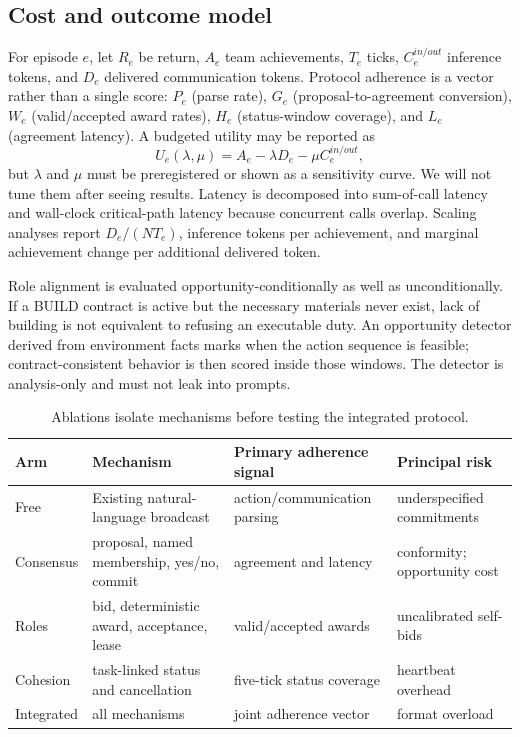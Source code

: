 \documentclass[11pt]{article}
\begin{document}
\subsection{Cost and outcome model}
For episode $e$, let $R_e$ be return, $A_e$ team achievements, $T_e$ ticks, $C_e^{in/out}$ inference tokens, and $D_e$ delivered communication tokens. Protocol adherence is a vector rather than a single score: $P_e$ (parse rate), $G_e$ (proposal-to-agreement conversion), $W_e$ (valid/accepted award rates), $H_e$ (status-window coverage), and $L_e$ (agreement latency). A budgeted utility may be reported as
\[
 U_e(\lambda,\mu)=A_e-\lambda D_e-\mu C_e^{in/out},
\]
but $\lambda$ and $\mu$ must be preregistered or shown as a sensitivity curve. We will not tune them after seeing results. Latency is decomposed into sum-of-call latency and wall-clock critical-path latency because concurrent calls overlap. Scaling analyses report $D_e/(N T_e)$, inference tokens per achievement, and marginal achievement change per additional delivered token.

Role alignment is evaluated opportunity-conditionally as well as unconditionally. If a BUILD contract is active but the necessary materials never exist, lack of building is not equivalent to refusing an executable duty. An opportunity detector derived from environment facts marks when the action sequence is feasible; contract-consistent behavior is then scored inside those windows. The detector is analysis-only and must not leak into prompts.

\begin{table}[t]
\centering\small
\begin{tabularx}{\textwidth}{lXXX}
\toprule
Arm & Mechanism & Primary adherence signal & Principal risk\\
\midrule
Free & Existing natural-language broadcast & action/communication parsing & underspecified commitments\\
Consensus & proposal, named membership, yes/no, commit & agreement and latency & conformity; opportunity cost\\
Roles & bid, deterministic award, acceptance, lease & valid/accepted awards & uncalibrated self-bids\\
Cohesion & task-linked status and cancellation & five-tick status coverage & heartbeat overhead\\
Integrated & all mechanisms & joint adherence vector & format overload\\
\bottomrule
\end{tabularx}
\caption{Ablations isolate mechanisms before testing the integrated protocol.}
\end{table}
\end{document}
